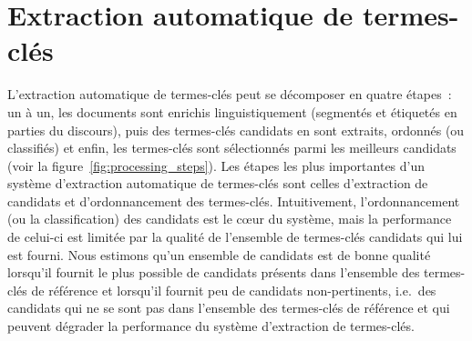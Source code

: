 \section{Extraction automatique de termes-clés}
\label{sec:extraction_automatique_de_termes_cles}
  L'extraction automatique de termes-clés peut se décomposer en quatre étapes~:
  un à un, les documents sont enrichis linguistiquement (segmentés et étiquetés
  en parties du discours), puis des termes-clés candidats en sont extraits,
  ordonnés (ou classifiés) et enfin, les termes-clés sont sélectionnés parmi les
  meilleurs candidats (voir la figure~\ref{fig:processing_steps}). Les étapes
  les plus importantes d'un système d'extraction automatique de termes-clés sont
  celles d'extraction de candidats et d'ordonnancement des termes-clés.
  Intuitivement, l'ordonnancement (ou la classification) des candidats est le
  c\oe{}ur du système, mais la performance de celui-ci est limitée par la
  qualité de l'ensemble de termes-clés candidats qui lui est fourni. Nous
  estimons qu'un ensemble de candidats est de bonne qualité lorsqu'il fournit le
  plus possible de candidats présents dans l'ensemble des termes-clés de
  référence et lorsqu'il fournit peu de candidats non-pertinents, i.e.~des
  candidats qui ne se sont pas dans l'ensemble des termes-clés de référence et
  qui peuvent dégrader la performance du système d'extraction de termes-clés.
